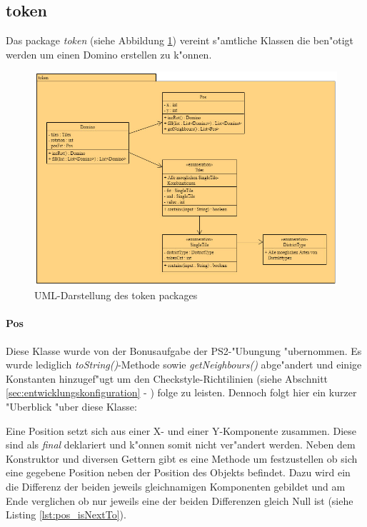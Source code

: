 \newpage
\subsection{token}
\label{ss:token}
Das package \emph{token} (siehe Abbildung \ref{fig:tokenPackage}) vereint s"amtliche Klassen die ben"otigt werden um einen Domino erstellen zu k"onnen. 

\begin{figure}
	\centering
	\includegraphics{pics/tokenPackage}
	\caption{UML-Darstellung des token packages}
	\label{fig:tokenPackage}
\end{figure}

\paragraph{Pos}
\label{par:pos}
Diese Klasse wurde von der Bonusaufgabe der PS2-"Ubungung "ubernommen. Es wurde lediglich \emph{toString()}-Methode sowie \emph{getNeighbours()} abge"andert und einige Konstanten hinzugef"ugt um den Checkstyle-Richtilinien 
(siehe Abschnitt \ref{sec:entwicklungskonfiguration} - ) 
folge zu leisten. Dennoch folgt hier ein kurzer "Uberblick "uber diese Klasse: 

Eine Position setzt sich aus einer X- und einer Y-Komponente zusammen. Diese sind als \emph{final} deklariert und k"onnen somit nicht ver"andert werden. Neben dem Konstruktor und diversen Gettern gibt es eine Methode um festzustellen ob sich eine gegebene Position neben der Position des Objekts befindet. Dazu wird ein die Differenz der beiden jeweils gleichnamigen Komponenten gebildet und am Ende verglichen ob nur jeweils eine der beiden Differenzen gleich Null ist (siehe Listing \ref{lst:pos_isNextTo}). 

